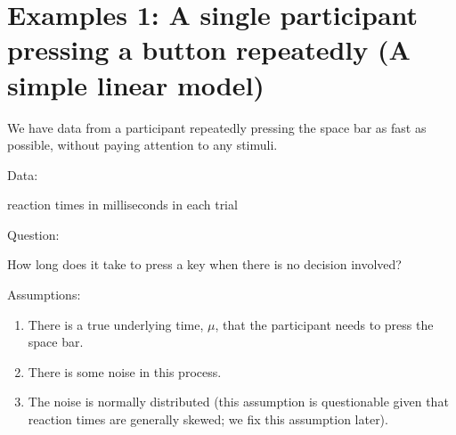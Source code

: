 \documentclass[12pt,ignorenonframetext,aspectratio=169]{beamer}
\providecommand{\tightlist}{%
  \setlength{\itemsep}{0pt}\setlength{\parskip}{0pt}}
\begin{document}
\hypertarget{examples-1-a-single-participant-pressing-a-button-repeatedly-a-simple-linear-model}{%
\section{Examples 1: A single participant pressing a button repeatedly (A simple linear model)}\label{examples-1-a-single-participant-pressing-a-button-repeatedly-a-simple-linear-model}}

\begin{frame}

We have data from a participant repeatedly pressing the space bar as fast as possible, without paying attention to any stimuli.

\begin{block}{Data:}

reaction times in milliseconds in each trial

\end{block}

\begin{block}{Question:}

How long does it take to press a key when there is no decision involved?

\end{block}

\end{frame}

\begin{frame}

\begin{block}{Assumptions:}

\begin{enumerate}
\tightlist
\item
  There is a true underlying time, \(\mu\), that the participant needs to press the space bar.
\item
  There is some noise in this process.
\item
  The noise is normally distributed (this assumption is questionable given that reaction times are generally skewed; we fix this assumption later).
\end{enumerate}

\end{block}

\end{frame}
\end{document}
